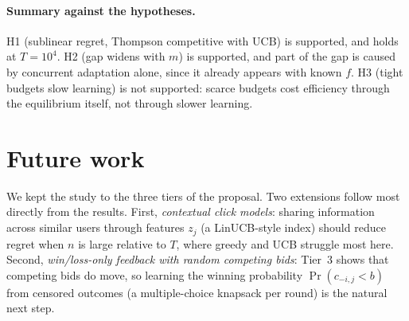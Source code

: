\documentclass[11pt]{article}
\theoremstyle{remark}
\begin{document}
\paragraph{Summary against the hypotheses.} H1 (sublinear regret, Thompson competitive with UCB) is
supported, and holds at $T=10^4$. H2 (gap widens with $m$) is supported, and part of the gap is caused
by concurrent adaptation alone, since it already appears with known $f$. H3 (tight budgets slow
learning) is not supported: scarce budgets cost efficiency through the equilibrium itself, not
through slower learning.

\section{Future work}
We kept the study to the three tiers of the proposal. Two extensions follow most directly from
the results. First, \emph{contextual click models}: sharing information across similar users through
features $z_j$ (a LinUCB-style index) should reduce regret when $n$ is large relative to $T$, where
greedy and UCB struggle most here. Second, \emph{win/loss-only feedback with random competing bids}:
Tier~3 shows that competing bids do move, so learning the winning probability $\Pr(c_{-i,j}<b)$ from
censored outcomes (a multiple-choice knapsack per round) is the natural next step.

\end{document}
